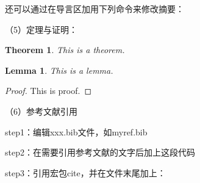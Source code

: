 \documentclass[a4paper]{article}
\newtheorem{theorem}{Theorem}
\newtheorem{lemma}{Lemma}
\newtheorem{proof}{Proof}
\begin{document}
还可以通过在导言区加用下列命令来修改摘要：


（5）定理与证明：%

\begin{theorem}
This is a theorem.
\end{theorem}

\begin{lemma}
This is a lemma.
\end{lemma}

\begin{proof}
This is proof.
\end{proof}

（6）参考文献引用

step1：编辑xxx.bib文件，如myref.bib

step2：在需要引用参考文献的文字后加上这段代码\cite{valentin2016learning} %

step3：引用宏包cite，并在文件末尾加上：


\end{document}
